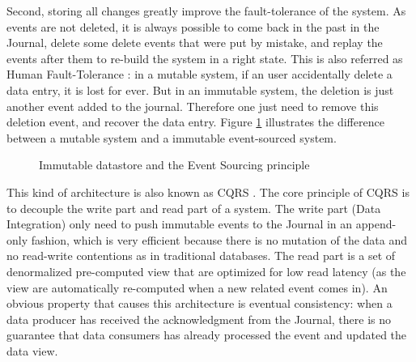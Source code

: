Second, storing all changes greatly improve the fault-tolerance of the system. As events are not deleted, it is always possible 
to come back in the past in the Journal, delete some delete events that were put by mistake, and replay the events after
them to re-build the system in a right state. This is also referred as Human Fault-Tolerance : in a mutable system,
if an user accidentally delete a data entry, it is lost for ever. But in an immutable system, the deletion is just another
event added to the journal. Therefore one just need to remove this deletion event, and recover the data entry. Figure \ref{fig:event-sourcing}
illustrates the difference between a mutable system and a immutable event-sourced system.
\\ 
\begin{figure}[h]
  \begin{center}
    \caption{Immutable datastore and the Event Sourcing principle}
    \label{fig:event-sourcing}
  \end{center}
\end{figure}

This kind of architecture is also known as CQRS . The core principle of CQRS is to decouple the write part and read part
of a system. The write part (Data Integration) only need to push immutable events to the Journal in an append-only fashion, which
is very efficient because there is no mutation of the data and no read-write contentions as in traditional databases.
The read part is a set of denormalized pre-computed view that are optimized for low read latency (as the view are automatically re-computed
when a new related event comes in).
An obvious property that causes this architecture is eventual consistency: when a data producer has received the acknowledgment
from the Journal, there is no guarantee that data consumers has already processed the event and updated the data view.

